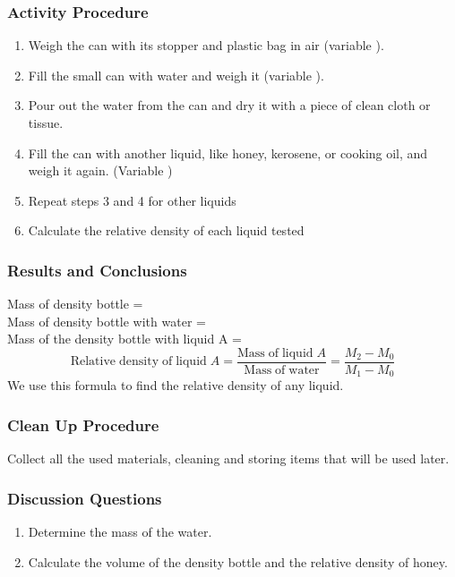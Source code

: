\subsubsection*{Activity Procedure}
\begin{enumerate}
\item{Weigh the can with its stopper and plastic bag in air (variable ).} 
\item{Fill the small can with water and weigh it (variable ).} 
\item{Pour out the water from the can and dry it with a piece of clean cloth or tissue.} 
\item{Fill the can with another liquid, like honey, kerosene, or cooking oil, and weigh it again. (Variable )}
\item{Repeat steps 3 and 4 for other liquids}
\item Calculate the relative density of each liquid tested
\end{enumerate}

\subsubsection*{Results and Conclusions}
Mass of density bottle = \\
Mass of density bottle with water = \\
Mass of the density bottle with liquid A = \\
$$\mathrm{Relative \;density \;of \;liquid \;}A = \frac{\mathrm{Mass \;of \;liquid \;}A}{\mathrm{Mass \;of \;water}} = \frac{M_2-M_0}{M_1-M_0}$$
We use this formula to find the relative density of any liquid.

\subsubsection*{Clean Up Procedure}
Collect all the used materials, cleaning and storing items that will be used later.

\subsubsection*{Discussion Questions}
\begin{enumerate}
\item{Determine the mass of the water.} 
\item{Calculate the volume of the density bottle and the relative density of honey.} 
\end{enumerate}

